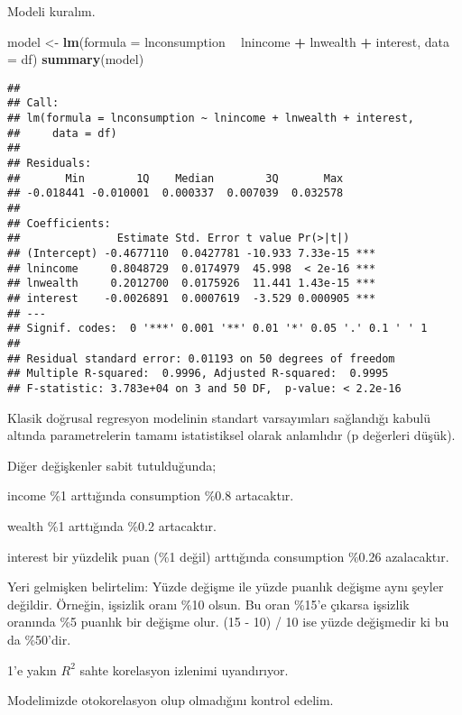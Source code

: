 \documentclass[
]{book}
\newenvironment{Shaded}{\begin{snugshade}}{\end{snugshade}}
\newcommand{\DataTypeTok}[1]{\textcolor[rgb]{0.13,0.29,0.53}{#1}}
\newcommand{\KeywordTok}[1]{\textcolor[rgb]{0.13,0.29,0.53}{\textbf{#1}}}
\newcommand{\NormalTok}[1]{#1}
\newcommand{\OperatorTok}[1]{\textcolor[rgb]{0.81,0.36,0.00}{\textbf{#1}}}
\newcommand{\StringTok}[1]{\textcolor[rgb]{0.31,0.60,0.02}{#1}}
\begin{document}
Modeli kuralım.

\begin{Shaded}
\begin{Highlighting}[]
\NormalTok{model <-}\StringTok{ }\KeywordTok{lm}\NormalTok{(}\DataTypeTok{formula =}\NormalTok{ lnconsumption }\OperatorTok{~}\StringTok{ }\NormalTok{lnincome }\OperatorTok{+}\StringTok{ }\NormalTok{lnwealth }\OperatorTok{+}\StringTok{ }\NormalTok{interest, }\DataTypeTok{data =}\NormalTok{ df)}
\KeywordTok{summary}\NormalTok{(model)}
\end{Highlighting}
\end{Shaded}

\begin{verbatim}
## 
## Call:
## lm(formula = lnconsumption ~ lnincome + lnwealth + interest, 
##     data = df)
## 
## Residuals:
##       Min        1Q    Median        3Q       Max 
## -0.018441 -0.010001  0.000337  0.007039  0.032578 
## 
## Coefficients:
##               Estimate Std. Error t value Pr(>|t|)    
## (Intercept) -0.4677110  0.0427781 -10.933 7.33e-15 ***
## lnincome     0.8048729  0.0174979  45.998  < 2e-16 ***
## lnwealth     0.2012700  0.0175926  11.441 1.43e-15 ***
## interest    -0.0026891  0.0007619  -3.529 0.000905 ***
## ---
## Signif. codes:  0 '***' 0.001 '**' 0.01 '*' 0.05 '.' 0.1 ' ' 1
## 
## Residual standard error: 0.01193 on 50 degrees of freedom
## Multiple R-squared:  0.9996, Adjusted R-squared:  0.9995 
## F-statistic: 3.783e+04 on 3 and 50 DF,  p-value: < 2.2e-16
\end{verbatim}

Klasik doğrusal regresyon modelinin standart varsayımları sağlandığı kabulü altında parametrelerin tamamı istatistiksel olarak anlamlıdır (p değerleri düşük).

Diğer değişkenler sabit tutulduğunda;

income \%1 arttığında consumption \%0.8 artacaktır.

wealth \%1 arttığında \%0.2 artacaktır.

interest bir yüzdelik puan (\%1 değil) arttığında consumption \%0.26 azalacaktır.

Yeri gelmişken belirtelim: Yüzde değişme ile yüzde puanlık değişme aynı şeyler değildir. Örneğin, işsizlik oranı \%10 olsun. Bu oran \%15'e çıkarsa işsizlik oranında \%5 puanlık bir değişme olur. (15 - 10) / 10 ise yüzde değişmedir ki bu da \%50'dir.

1'e yakın \(R^2\) sahte korelasyon izlenimi uyandırıyor.

Modelimizde otokorelasyon olup olmadığını kontrol edelim.
\end{document}
